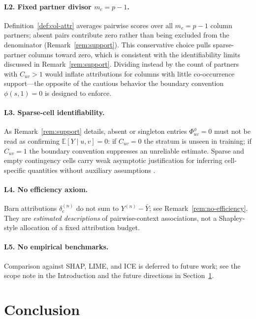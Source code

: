 \documentclass[11pt]{article}
\begin{document}
\paragraph{L2. Fixed partner divisor $m_c = p - 1$.}
Definition~\ref{def:col-attr} averages pairwise scores over all $m_c = p - 1$ column partners; absent pairs contribute zero rather than being excluded from the denominator (Remark~\ref{rem:support}).
This conservative choice pulls sparse-partner columns toward zero, which is consistent with the identifiability limits discussed in Remark~\ref{rem:support}.
Dividing instead by the count of partners with $C_{uv} > 1$ would inflate attributions for columns with little co-occurrence support---the opposite of the cautious behavior the boundary convention $\phi(s, 1) = 0$ is designed to enforce.

\paragraph{L3. Sparse-cell identifiability.}
As Remark~\ref{rem:support} details, absent or singleton entries $\Phi^\phi_{uv} = 0$ must not be read as confirming $\mathbb{E}[Y \mid u, v] = 0$: if $C_{uv} = 0$ the stratum is unseen in training; if $C_{uv} = 1$ the boundary convention suppresses an unreliable estimate.
Sparse and empty contingency cells carry weak asymptotic justification for inferring cell-specific quantities without auxiliary assumptions \cite{Agresti2013,Manski2003}.

\paragraph{L4. No efficiency axiom.}
Barn attributions $\delta_c^{(n)}$ do not sum to $Y^{(n)} - \bar{Y}$; see Remark~\ref{rem:no-efficiency}.
They are \emph{estimated descriptions} of pairwise-context associations, not a Shapley-style allocation of a fixed attribution budget.

\paragraph{L5. No empirical benchmarks.}
Comparison against SHAP, LIME, and ICE is deferred to future work; see the scope note in the Introduction and the future directions in Section~\ref{sec:conclusion}.

\section{Conclusion}
\label{sec:conclusion}
\end{document}
